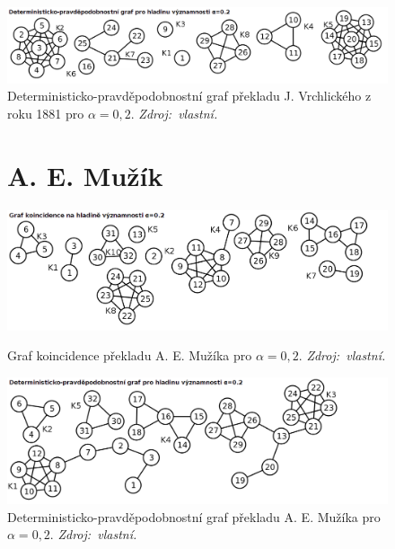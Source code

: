 \documentclass[dp.tex]{subfiles}
\begin{document}
\begin{figure}[h]
	\vspace*{0.5cm}

	\includegraphics[max width=\textwidth,keepaspectratio=true]{imgs-99-priloha-d/b_d_20}
	\caption[Deterministicko-pravděpodobnostní graf překladu J. Vrchlického z roku 1881 pro $\alpha = 0{,}2$]
            {Deterministicko-pravděpodobnostní graf překladu J. Vrchlického z roku 1881 pro $\alpha = 0{,}2$. \textit{Zdroj:~vlastní.}}
	\label{fig:b_d_20}
\end{figure}

\begin{figure}[h]
\section*{A. E. Mužík}
	{
		\centering
		\includegraphics[max width=\textwidth,keepaspectratio=true]{imgs-99-priloha-d/r_k_20}
		\caption[Graf koincidence překladu A. E. Mužíka pro $\alpha = 0{,}2$]
	            {Graf koincidence překladu A. E. Mužíka pro $\alpha = 0{,}2$. \textit{Zdroj:~vlastní.}}
		\label{fig:r_k_20}
	
		\vspace*{0.5cm}
	
		\includegraphics[max width=\textwidth,keepaspectratio=true]{imgs-99-priloha-d/r_d_20}
		\caption[Deterministicko-pravděpodobnostní graf překladu A. E. Mužíka pro $\alpha = 0{,}2$]
	            {Deterministicko-pravděpodobnostní graf překladu A. E. Mužíka pro $\alpha = 0{,}2$. \textit{Zdroj:~vlastní.}}
		\label{fig:r_d_20}
	}


\end{figure}
\end{document}

